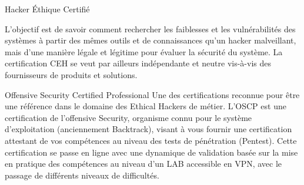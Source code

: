  Hacker Éthique Certifié 

L'objectif est de savoir comment rechercher les faiblesses et les vulnérabilités des systèmes  à partir des mêmes outils et de connaissances qu’un hacker malveillant, mais d’une manière légale et légitime pour évaluer la sécurité du système. La certification CEH se veut par ailleurs indépendante et neutre vis-à-vis des fournisseurs de produits et solutions.

 Offensive Security Certified Professional
Une des certifications reconnue pour être une référence dans le domaine des Ethical Hackers de métier. L’OSCP est une certification de l’offensive Security, organisme connu pour le système d’exploitation   (anciennement Backtrack), visant à vous fournir une certification attestant de vos compétences au niveau des tests de pénétration (Pentest). Cette certification se passe en ligne avec une dynamique de validation basée sur la mise en pratique des compétences au niveau d’un LAB accessible en VPN, avec le passage de différents niveaux de difficultés.




